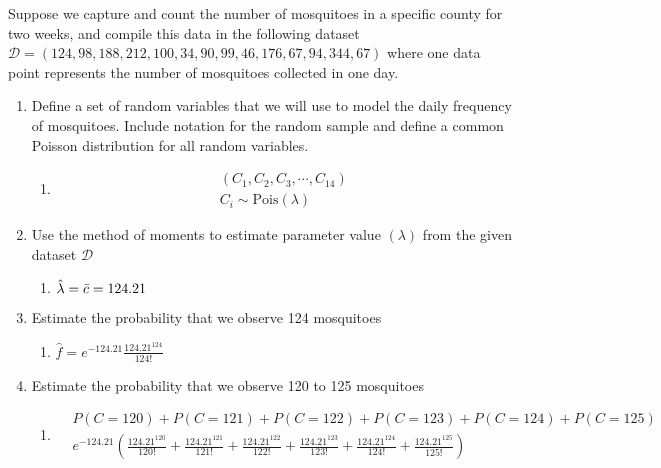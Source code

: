 \documentclass[krantz1,ChapterTOCs]{krantz}
\begin{document}
\begin{enumerate}
    Suppose we capture and count the number of mosquitoes in a specific county for two weeks, and compile this data in the following dataset $\mathcal{D} = (124,98,188,212,100,34,90,99,46,176,67,94,344,67)$ where one data point represents the number of mosquitoes collected in one day.
    
    \begin{enumerate}
        \item Define a set of random variables that we will use to model the daily frequency of mosquitoes. Include notation for the random sample and define a common Poisson distribution for all random variables.
        \begin{enumerate}
            \item {
            \color{red} 
            \begin{align}
                (C_{1}, C_{2}, C_{3}, \cdots, C_{14} )\\
                C_{i} \sim \text{Pois}(\lambda)
            \end{align}
            } 
        \end{enumerate}


        \item Use the method of moments to estimate parameter value $(\lambda)$ from the given dataset $\mathcal{D}$
        \begin{enumerate}
            \item {
            \color{red} 
                $\hat{\lambda} = \Bar{c} = 124.21$
            } 
        \end{enumerate}

        \item Estimate the probability that we observe 124 mosquitoes
        \begin{enumerate}
            \item {
            \color{red} 
                $\hat{f} = e^{-124.21} \frac{124.21^{124}}{124!}$
            } 
        \end{enumerate}

        \item Estimate the probability that we observe 120 to 125 mosquitoes
        \begin{enumerate}
            \item {
            \color{red} 
                \begin{align}
                    &P(C=120) + P(C=121) +P(C=122) +P(C=123) +P(C=124) + P(C=125) \\ 
                    & e^{-124.21} \left(\frac{124.21^{120}}{120!} + \frac{124.21^{121}}{121!} + \frac{124.21^{122}}{122!} + \frac{124.21^{123}}{123!} + \frac{124.21^{124}}{124!} + \frac{124.21^{125}}{125!} \right)    
                \end{align}
            } 
        \end{enumerate}


\end{enumerate}
\end{enumerate}
\end{document}
